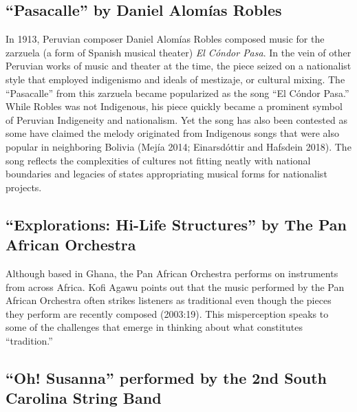 \documentclass[twoside]{article}
\begin{document}
\hypertarget{pasacalle-by-daniel-alomuxedas-robles}{%
\subsection*{``Pasacalle'' by Daniel Alomías
Robles}\label{pasacalle-by-daniel-alomuxedas-robles}}

In 1913, Peruvian composer Daniel Alomías Robles composed music for the
zarzuela (a form of Spanish musical theater) \emph{El Cóndor Pasa}. In
the vein of other Peruvian works of music and theater at the time, the
piece seized on a nationalist style that employed indigenismo and ideals
of mestizaje, or cultural mixing. The ``Pasacalle'' from this zarzuela
became popularized as the song ``El Cóndor Pasa.'' While Robles was not
Indigenous, his piece quickly became a prominent symbol of Peruvian
Indigeneity and nationalism. Yet the song has also been contested as
some have claimed the melody originated from Indigenous songs that were
also popular in neighboring Bolivia (Mejía 2014; ​​Einarsdóttir and
Hafsdein 2018). The song reflects the complexities of cultures not
fitting neatly with national boundaries and legacies of states
appropriating musical forms for nationalist projects.

\hypertarget{explorations-hi-life-structures-by-the-pan-african-orchestra}{%
\subsection*{``Explorations: Hi-Life Structures'' by The Pan African
Orchestra}\label{explorations-hi-life-structures-by-the-pan-african-orchestra}}

Although based in Ghana, the Pan African Orchestra performs on
instruments from across Africa. Kofi Agawu points out that the music
performed by the Pan African Orchestra often strikes listeners as
traditional even though the pieces they perform are recently composed
(2003:19). This misperception speaks to some of the challenges that
emerge in thinking about what constitutes ``tradition.''~

\hypertarget{oh-susanna-performed-by-the-2nd-south-carolina-string-band}{%
\subsection*{``Oh! Susanna'' performed by the 2nd South Carolina
String
Band}\label{oh-susanna-performed-by-the-2nd-south-carolina-string-band}}
\end{document}
